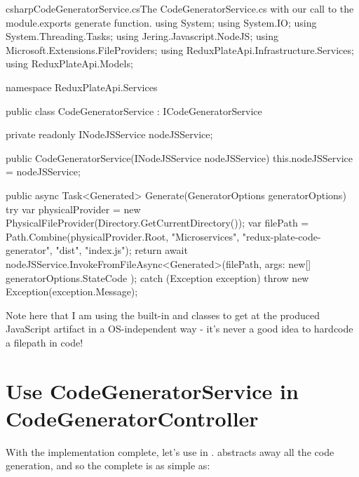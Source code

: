 \documentclass[a4paper,headinclude=on,footinclude=on,12pt,oneside]{scrbook}
\begin{document}
\begin{codeInput}{csharp}{CodeGeneratorService.cs}{The CodeGeneratorService.cs with our call to the module.exports generate function.}
using System;
using System.IO;
using System.Threading.Tasks;
using Jering.Javascript.NodeJS;
using Microsoft.Extensions.FileProviders;
using ReduxPlateApi.Infrastructure.Services;
using ReduxPlateApi.Models;

namespace ReduxPlateApi.Services
{
    public class CodeGeneratorService : ICodeGeneratorService
    {
        private readonly INodeJSService nodeJSService;

        public CodeGeneratorService(INodeJSService nodeJSService)
        {
            this.nodeJSService = nodeJSService;
        }

        public async Task<Generated> Generate(GeneratorOptions generatorOptions)
        {
            try
            {
                var physicalProvider = new PhysicalFileProvider(Directory.GetCurrentDirectory());
                var filePath = Path.Combine(physicalProvider.Root, "Microservices", "redux-plate-code-generator", "dist", "index.js");
                return await nodeJSService.InvokeFromFileAsync<Generated>(filePath, args: new[] { generatorOptions.StateCode });
            }
            catch (Exception exception)
            {
                throw new Exception(exception.Message);
            }
        }
    }
}  
\end{codeInput}

Note here that I am using the built-in  and  classes to get at the produced JavaScript artifact in a OS-independent way - it's never a good idea to hardcode a filepath in code!

\section{Use CodeGeneratorService in CodeGeneratorController}

With the implementation complete, let's use  in .  abstracts away all the code generation, and so the complete  is as simple as:
\end{document}
